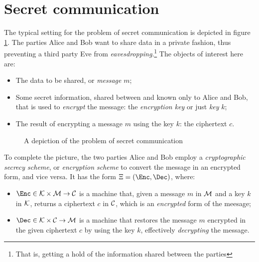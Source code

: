 
\section{Secret communication}

The typical setting for the problem of secret communication is depicted in figure \ref{fig:secrecy}. The parties Alice and Bob want to share data in a private fashion, thus preventing a third party Eve from \emph{eavesdropping}.\footnote{That is, getting a hold of the information shared between the parties} The objects of interest here are:
\begin{itemize}
    \item The data to be shared, or \emph{message} $m$;
    \item Some secret information, shared between and known only to Alice and Bob, that is used to \emph{encrypt} the message: the \emph{encryption key} or just \emph{key} $k$;
    \item The result of encrypting a message $m$ using the key $k$: the ciphertext $c$.
\end{itemize}

\begin{figure}[ht]
    \centering

    \caption{A depiction of the problem of secret communication}
    \label{fig:secrecy}
\end{figure}

To complete the picture, the two parties Alice and Bob employ a \emph{cryptographic secrecy scheme}, or \emph{encryption scheme} to convert the message in an encrypted form, and vice versa. It has the form $\Xi = (\Enc, \Dec)$, where:
\begin{itemize}
    \item $\Enc \in \K \times \M \to \C$ is a machine that, given a message $m$ in $\mathcal{M}$ and a key $k$ in $\mathcal{K}$, returns a ciphertext $c$ in $\mathcal{C}$, which is an \emph{encrypted} form of the meesage;
    \item $\Dec \in \K \times \C \to \M$ is a machine that restores the message $m$ encrypted in the given ciphertext $c$ by using the key $k$, effectively \emph{decrypting} the message.
\end{itemize}


